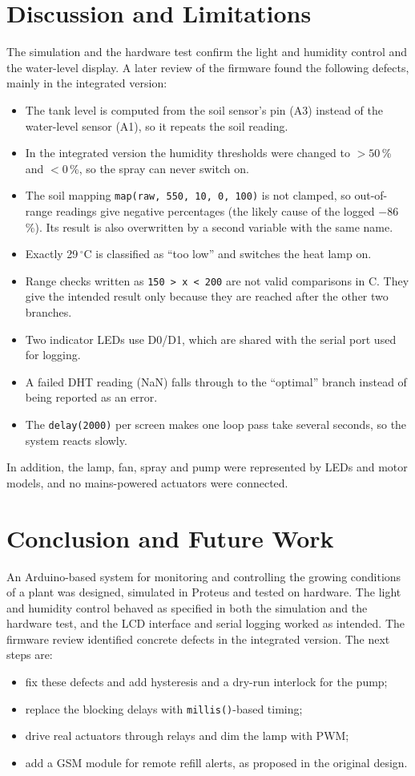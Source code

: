 \documentclass[10pt,twocolumn,a4paper]{article}
\begin{document}
\section{Discussion and Limitations}\label{sec:disc}
The simulation and the hardware test confirm the light and humidity control and the water-level display. A later review of the firmware found the following defects, mainly in the integrated version:
\begin{itemize}\setlength\itemsep{0pt}
\item The tank level is computed from the soil sensor's pin (A3) instead of the water-level sensor (A1), so it repeats the soil reading.
\item In the integrated version the humidity thresholds were changed to $>50$\,\% and $<0$\,\%, so the spray can never switch on.
\item The soil mapping \texttt{map(raw, 550, 10, 0, 100)} is not clamped, so out-of-range readings give negative percentages (the likely cause of the logged $-86$\,\%). Its result is also overwritten by a second variable with the same name.
\item Exactly 29\,$^\circ$C is classified as ``too low'' and switches the heat lamp on.
\item Range checks written as \texttt{150 > x < 200} are not valid comparisons in C. They give the intended result only because they are reached after the other two branches.
\item Two indicator LEDs use D0/D1, which are shared with the serial port used for logging.
\item A failed DHT reading (NaN) falls through to the ``optimal'' branch instead of being reported as an error.
\item The \texttt{delay(2000)} per screen makes one loop pass take several seconds, so the system reacts slowly.
\end{itemize}
In addition, the lamp, fan, spray and pump were represented by LEDs and motor models, and no mains-powered actuators were connected.

\section{Conclusion and Future Work}
An Arduino-based system for monitoring and controlling the growing conditions of a plant was designed, simulated in Proteus and tested on hardware. The light and humidity control behaved as specified in both the simulation and the hardware test, and the LCD interface and serial logging worked as intended. The firmware review identified concrete defects in the integrated version. The next steps are:
\begin{itemize}\setlength\itemsep{0pt}
\item fix these defects and add hysteresis and a dry-run interlock for the pump;
\item replace the blocking delays with \texttt{millis()}-based timing;
\item drive real actuators through relays and dim the lamp with PWM;
\item add a GSM module for remote refill alerts, as proposed in the original design.
\end{itemize}
\end{document}
